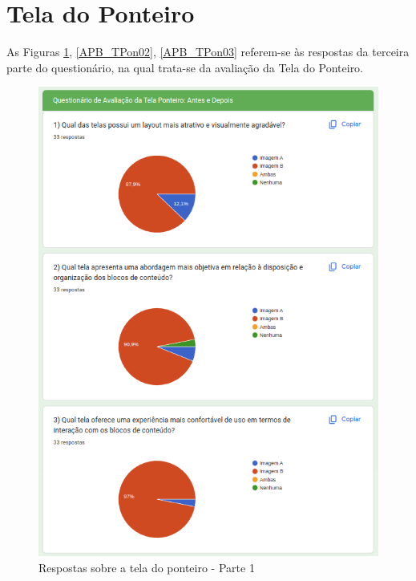 \newpage

\section{Tela do Ponteiro}

As Figuras \ref{APB_TPon01}, \ref{APB_TPon02}, \ref{APB_TPon03} referem-se às respostas da terceira parte do questionário, na qual trata-se da avaliação da Tela do Ponteiro.

\begin{figure}[!h]
	\begin{center}
	    \includegraphics[scale=0.7]{figs/Answers/Students/17.png}
	\end{center}
	\caption{\label{APB_TPon01}Respostas sobre a tela do ponteiro - Parte 1}
\end{figure}

\newpage

